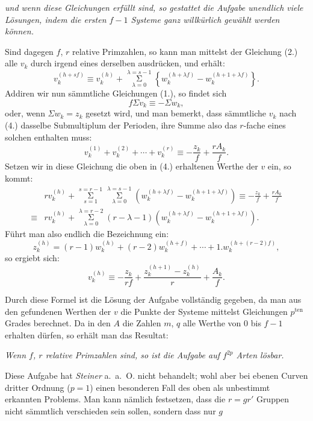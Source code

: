 \documentclass{article}
\begin{document}
\emph{und wenn diese Gleichungen erfüllt sind, so gestattet die Aufgabe unendlich viele Lösungen, indem die ersten $f-1$ Systeme ganz willkürlich gewählt werden können.}

Sind dagegen $f$, $r$ relative Primzahlen, so kann man mittelst der Gleichung (2.) alle $v_{k}$ durch irgend eines derselben ausdrücken, und erhält:
\[ v_{k}^{(h+sf)} \equiv v_{k}^{(h)}+\mathop{\Sigma}\limits_{\lambda=0}^{\lambda=s-1}\left\{ w_{k}^{(h+\lambda f)}-w_{k}^{(h+1+\lambda f)} \right\}. \tag{4.} \]
Addiren wir nun sämmtliche Gleichungen (1.), so findet sich
\[ f\Sigma v_{k} \equiv -\Sigma w_{k}, \]
oder, wenn $\Sigma w_{k}=z_{k}$ gesetzt wird, und man bemerkt, dass sämmtliche $v_{k}$ nach (4.) dasselbe Submultiplum der Perioden, ihre Summe also das $r$-fache eines solchen enthalten muss:
\[ v_{k}^{(1)}+v_{k}^{(2)}+\cdots+v_{k}^{(r)} \equiv -\frac{z_{k}}{f}+\frac{rA_{k}}{f}. \]
Setzen wir in diese Gleichung die oben in (4.) erhaltenen Werthe der $v$ ein, so kommt:
\[ \begin{aligned}
& r v_{k}^{(h)}+\mathop{\Sigma}\limits_{s=1}^{s=r-1}\mathop{\Sigma}\limits_{\lambda=0}^{\lambda=s-1}\left( w_{k}^{(h+\lambda f)}-w_{k}^{(h+1+\lambda f)} \right) \equiv -\frac{z_{k}}{f}+\frac{rA_{k}}{f} \\
\equiv{} & r v_{k}^{(h)}+\mathop{\Sigma}\limits_{\lambda=0}^{\lambda=r-2}(r-\lambda-1)\left( w_{k}^{(h+\lambda f)}-w_{k}^{(h+1+\lambda f)} \right).
\end{aligned} \]
Führt man also endlich die Bezeichnung ein:
\[ z_{k}^{(h)} = (r-1)w_{k}^{(h)}+(r-2)w_{k}^{(h+f)}+\cdots+1.w_{k}^{(h+(r-2)f)}, \tag{5.} \]
so ergiebt sich:
\[ v_{k}^{(h)} \equiv -\frac{z_{k}}{rf}+\frac{z_{k}^{(h+1)}-z_{k}^{(h)}}{r}+\frac{A_{k}}{f}. \tag{6.} \]

Durch diese Formel ist die Lösung der Aufgabe vollständig gegeben, da man aus den gefundenen Werthen der $v$ die Punkte der Systeme mittelst Gleichungen $p^{\text{ten}}$ Grades berechnet. Da in den $A$ die Zahlen $m$, $q$ alle Werthe von 0 bis $f-1$ erhalten dürfen, so erhält man das Resultat:

\emph{Wenn $f$, $r$ relative Primzahlen sind, so ist die Aufgabe auf $f^{2p}$ Arten lösbar.}

Diese Aufgabe hat \emph{Steiner} a.\ a.\ O. nicht behandelt; wohl aber bei ebenen Curven dritter Ordnung ($p=1$) einen besonderen Fall des oben als unbestimmt erkannten Problems. Man kann nämlich festsetzen, dass die $r=gr'$ Gruppen nicht sämmtlich verschieden sein sollen, sondern dass nur $g$
\end{document}
